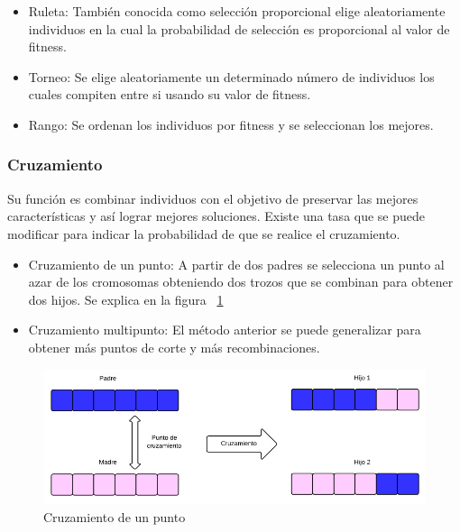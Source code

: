 \begin{itemize}
	\item Ruleta: También conocida como selección proporcional elige aleatoriamente individuos en la cual la probabilidad de selección es proporcional al valor de fitness.
	\item Torneo: Se elige aleatoriamente un determinado número de individuos los cuales compiten entre si usando su valor de fitness.
	\item Rango: Se ordenan los individuos por fitness y se seleccionan los mejores.
\end{itemize}

\subsubsection{Cruzamiento}
Su función es combinar individuos con el objetivo de preservar las mejores características y así lograr mejores soluciones. 
Existe una tasa que se puede modificar para indicar la probabilidad de que se realice el cruzamiento.

\begin{itemize}
	\item Cruzamiento de un punto: A partir de dos padres se selecciona un punto al azar de los cromosomas obteniendo dos trozos que se combinan para obtener dos hijos. Se explica en la figura ~\ref{fig:cruzamiento1}
	\item Cruzamiento multipunto: El método anterior se puede generalizar para obtener más puntos de corte y más recombinaciones.
\end{itemize}

\begin{figure}[h]
	\centering
	\includegraphics[width=\textwidth]{Figures/cruzamiento1}
	\caption{Cruzamiento de un punto}
	\label{fig:cruzamiento1}
\end{figure}

